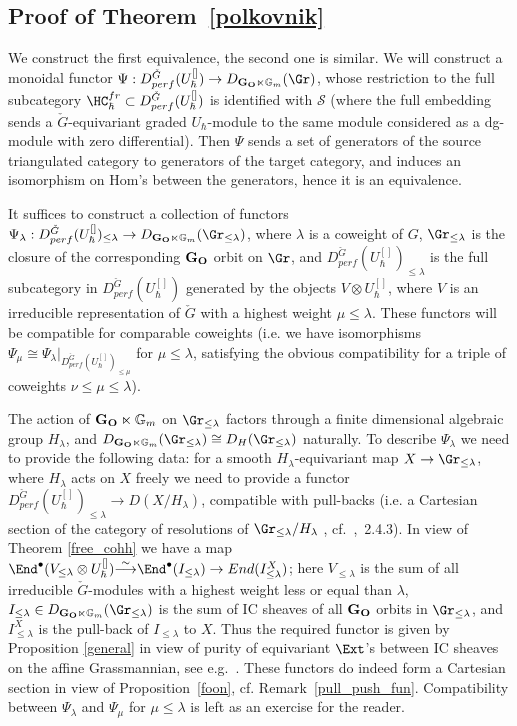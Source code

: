 \documentclass[11pt]{amsart}
\theoremstyle{definition}
\theoremstyle{remark}
\theoremstyle{remark}
\newcommand{\bu}{\bullet}
\newcommand{\iso}{{\stackrel{\sim}{\longrightarrow}}}
\newcommand{\<}{\langle}
\renewcommand{\>}{\rangle}
\newcommand{\LG}{{\check{G}}}
\newcommand{\GO}{{\bf G_O}}
\newcommand{\Gm}{{{\mathbb G}_m}}
\newcommand{\HChfr}{\HC_\hbar^{fr}}
\newcommand{\eqss}{{\mathcal{S}}}
\newcommand{\Duh}{{U_\hbar^{[]}}}
\newcommand{\la}{\lambda}
\begin{document}
\subsection{Proof of  Theorem~\ref{polkovnik}} 
We construct the first equivalence, the second one is similar. 
We will construct a monoidal functor 
$\Psi:D^{\LG}_{perf}(\Duh) \to D_{\GO\ltimes \Gm}(\Gr)$, whose restriction to
the full subcategory $\HChfr\subset D^{\LG}_{perf}(\Duh)$
is identified with $\eqss$ (where the full embedding 
sends a $\LG$-equivariant graded $U_\hbar$-module to the same module
considered as a dg-module with zero differential). Then $\Psi$
sends a set of generators of the source triangulated category
to generators of the target category, and induces an isomorphism on
Hom's between the generators, hence it is an equivalence.

It suffices to construct a collection of functors
$\Psi_\la:  D^{\LG}_{perf}(\Duh)_{\leq \la}\to
D_{\GO\ltimes \Gm}(\Gr_{\leq \la})$, where $\la$ is a coweight of $G$,
$\Gr_{\leq \la}$ is the closure of the corresponding $\GO$ orbit on
$\Gr$, and $ D^{\LG}_{perf}(\Duh)_{\leq \la}$
 is the full subcategory
in  $ D^{\LG}_{perf}(\Duh)$ generated by the objects $V\otimes \Duh$,
where $V$ is an irreducible representation of $\LG$ with a highest weight
$\mu \leq \la$.
These functors will be compatible for comparable coweights
(i.e. we have isomorphisms $\Psi_\mu\cong
 \Psi_\la|_{ D^{\LG}_{perf}(\Duh)_{\leq \mu}}$ for $\mu\leq \la$,
satisfying the obvious compatibility for a triple of coweights
$\nu\leq \mu \leq \la$).

The action of $\GO\ltimes \Gm$ on $\Gr_{\leq \la}$ factors
through a finite dimensional algebraic group $H_\la$, and 
 $D_{\GO\ltimes \Gm}(\Gr_{\leq \la})\cong 
D_H(\Gr_{\leq \la})$ naturally.
To describe $\Psi_\la$ we need to provide the following data:
for a smooth $H_\la$-equivariant
 map $X\to \Gr_{\leq \la}$, where $H_\la$ acts on $X$ freely 
we need to provide a functor 
$D^\LG_{perf}(\Duh)_{\leq \la}\to D(X/H_\la)$, compatible with pull-backs
(i.e. a Cartesian section of the category of resolutions of
$\Gr_{\leq \la}/H_\la$ , cf.~\cite{BL},~2.4.3). 
In view of Theorem \ref{free_cohh} we have
a map $\End^\bu (V_{\leq \la}\otimes \Duh) \iso 
\End^\bu (I_{\leq \la})\to End(I_{\leq \la}^X)$;
here $V_{\leq \la}$ is the sum of all irreducible $\LG$-modules
with a highest weight less or equal than $\la$, $I_{\leq \la}
\in D_{\GO\ltimes \Gm}(\Gr_{\leq \la})$ is the sum of
IC sheaves of all $\GO$ orbits in $\Gr_{\leq \la}$, and 
$I_{\leq \la}^X$ is the pull-back of $I_{\leq \la}$ to $X$.
Thus the required functor is given by 
 Proposition \ref{general} in view of 
 purity of equivariant $\Ext$'s
between IC sheaves on the affine Grassmannian,
 see e.g.~\cite{Ga}.
These functors do indeed form a Cartesian
section  in view of
 Proposition~\ref{foon}, cf. Remark~\ref{pull_push_fun}. 
Compatibility between $\Psi_\la$ and $\Psi_\mu$ for $\mu\leq \la$
is left as an exercise for the reader.
\end{document}
